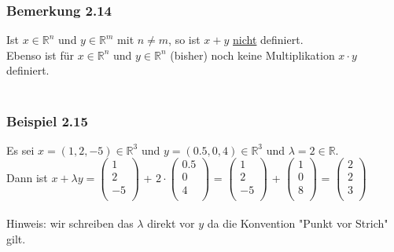 \documentclass{article}
\begin{document}
\subsubsection*{Bemerkung 2.14}
Ist $x \in \mathbb{R}^n$ und $y \in \mathbb{R}^m$ mit $n \neq m$, so ist $x+y$ \underline{nicht} definiert. \\
Ebenso ist für $x \in \mathbb{R}^n$ und $y \in \mathbb{R}^n$ (bisher) noch keine Multiplikation $x \cdot y$ definiert. \\
\\
\subsubsection*{Beispiel 2.15}
Es sei $x=(1,2,-5) \in \mathbb{R}^3$ und $y=(0.5, 0, 4) \in \mathbb{R}^3$ und $\lambda = 2 \in \mathbb{R}$. \\
Dann ist $x+\lambda y = \begin{pmatrix}
    1 \\
    2 \\
    -5 \\
\end{pmatrix}$ + $2 \cdot \begin{pmatrix}
    0.5 \\
    0 \\
    4 \\
\end{pmatrix}$ = $\begin{pmatrix}
    1 \\
    2 \\
    -5 \\
\end{pmatrix}$ + $\begin{pmatrix}
    1 \\
    0 \\
    8 \\
\end{pmatrix}$ = $\begin{pmatrix}
    2 \\
    2 \\
    3 \\
\end{pmatrix}$ \\
\\
Hinweis: wir schreiben das $\lambda$ direkt vor $y$ da die Konvention "Punkt vor Strich" gilt. \\
\\
\end{document}
